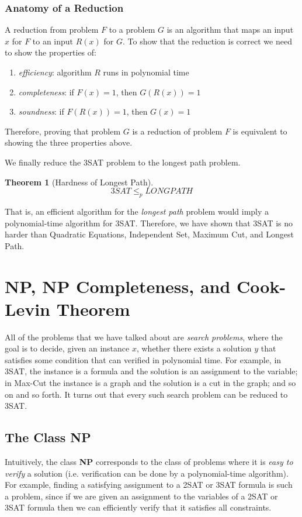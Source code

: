\documentclass[a4paper, 12pt]{report}
\newtheorem{theorem}{Theorem}[section]
\theoremstyle{remark}
\theoremstyle{definition}
\begin{document}
\subsubsection{Anatomy of a Reduction}
A reduction from problem $F$ to a problem $G$ is an algorithm that maps an input $x$ for $F$ to an input $R(x)$ for $G$. To show that the reduction is correct we need to show the properties of: 
\begin{enumerate}
    \item \textit{efficiency}: algorithm $R$ runs in polynomial time
    \item \textit{completeness}: if $F(x) = 1$, then $G(R(x)) = 1$ 
    \item \textit{soundness}: if $F(R(x)) = 1$, then $G(x) = 1$
\end{enumerate}
Therefore, proving that problem $G$ is a reduction of problem $F$ is equivalent to showing the three properties above. 

We finally reduce the 3SAT problem to the longest path problem. 

\begin{theorem}[Hardness of Longest Path]
\[3SAT \leq_p LONGPATH\]
\end{theorem}
That is, an efficient algorithm for the \textit{longest path} problem would imply a polynomial-time algorithm for 3SAT. Therefore, we have shown that 3SAT is no harder than Quadratic Equations, Independent Set, Maximum Cut, and Longest Path. 

\section{NP, NP Completeness, and Cook-Levin Theorem}
All of the problems that we have talked about are \textit{search problems}, where the goal is to decide, given an instance $x$, whether there exists a solution $y$ that satisfies some condition that can verified in polynomial time. For example, in 3SAT, the instance is a formula and the solution is an assignment to the variable; in Max-Cut the instance is a graph and the solution is a cut in the graph; and so on and so forth. It turns out that every such search problem can be reduced to 3SAT. 

\subsection{The Class NP}
Intuitively, the class \textbf{NP} corresponds to the class of problems where it is \textit{easy to verify} a solution (i.e. verification can be done by a polynomial-time algorithm). For example, finding a satisfying assignment to a 2SAT or 3SAT formula is such a problem, since if we are given an assignment to the variables of a 2SAT or 3SAT formula then we can efficiently verify that it satisfies all constraints. 
\end{document}
